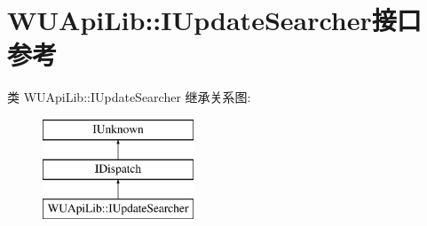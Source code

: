 \hypertarget{interface_w_u_api_lib_1_1_i_update_searcher}{}\section{W\+U\+Api\+Lib\+:\+:I\+Update\+Searcher接口 参考}
\label{interface_w_u_api_lib_1_1_i_update_searcher}
类 W\+U\+Api\+Lib\+:\+:I\+Update\+Searcher 继承关系图\+:\begin{figure}[H]
\begin{center}
\leavevmode
\includegraphics[height=3.000000cm]{interface_w_u_api_lib_1_1_i_update_searcher}
\end{center}
\end{figure}
